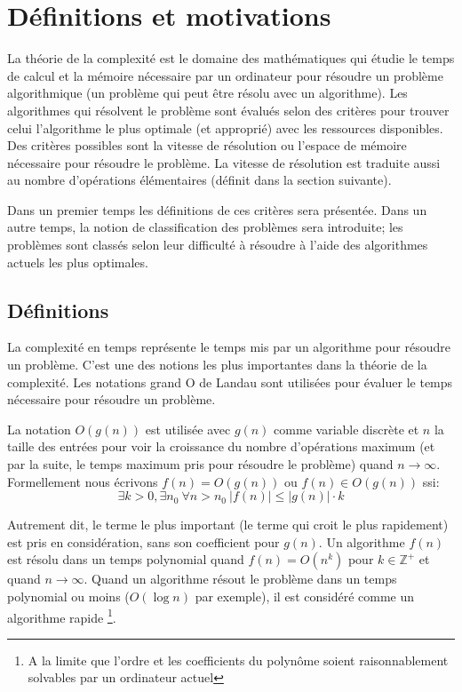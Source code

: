 \documentclass[../main.tex]{subfiles}
\begin{document}
\section{Définitions et motivations}
La théorie de la complexité est le domaine des mathématiques qui étudie le temps de calcul et la mémoire nécessaire par un ordinateur pour résoudre un problème algorithmique (un problème qui peut être résolu avec un algorithme). Les algorithmes qui résolvent le problème sont évalués selon des critères pour trouver celui l'algorithme le plus optimale (et approprié) avec les ressources disponibles. Des critères possibles sont la vitesse de résolution ou l'espace de mémoire nécessaire pour résoudre le problème. La vitesse de résolution est traduite aussi au nombre d'opérations élémentaires (définit dans la section suivante).

Dans un premier temps les définitions de ces critères sera présentée. Dans un autre temps, la notion de classification des problèmes sera introduite; les problèmes sont classés selon leur \og difficulté \fg{} à résoudre à l'aide des algorithmes actuels les plus optimales.

\subsection{Définitions}
La complexité en temps représente le temps mis par un algorithme pour résoudre un problème. C'est une des notions les plus importantes dans la théorie de la complexité. Les notations grand O de Landau sont utilisées pour évaluer le temps nécessaire pour résoudre un problème.
\begin{definition}
La notation $O(g(n))$ est utilisée avec $g(n)$ comme variable discrète et $n$ la taille des entrées pour voir la croissance du nombre d'opérations maximum (et par la suite, le temps maximum pris pour résoudre le problème) quand $n\to\infty$. Formellement nous écrivons $f(n)=O(g(n))$ ou $f(n) \in O(g(n))$ ssi:
\begin{equation*}
     \exists k > 0, \exists n_0 \ \forall n > n_0 \ |f(n)| \leq |g(n)| \cdot k
\end{equation*}
\end{definition}

Autrement dit, le terme le plus important (le terme qui croit le plus rapidement) est pris en considération, sans son coefficient pour $g(n)$. Un algorithme $f(n)$ est résolu dans un temps polynomial quand $f(n)=O(n^k)$ pour $k \in \mathbb{Z}^+$ et quand $n\to\infty$. Quand un algorithme résout le problème dans un temps polynomial ou moins ($O(\log n)$ par exemple), il est considéré comme un algorithme rapide \footnote{A la limite que l'ordre et les coefficients du polynôme soient raisonnablement solvables par un ordinateur actuel}.
\end{document}
